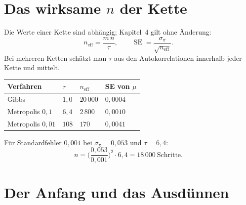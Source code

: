 \section{Das wirksame $n$ der Kette}

\begin{merksatz}
Die Werte einer Kette sind abhängig; Kapitel~4 gilt ohne Änderung:
\[ n_{\text{eff}} = \frac{m\,n}{\tau}, \qquad \operatorname{SE} = \frac{\sigma_\pi}{\sqrt{n_{\text{eff}}}} . \]
Bei mehreren Ketten schätzt man $\tau$ aus den Autokorrelationen innerhalb jeder Kette und mittelt.

\begin{center}
{\small
\renewcommand{\arraystretch}{1.48}
\begin{tabular}{@{}P{3.2cm}P{1.4cm}P{2.0cm}P{2.0cm}@{}}
\toprule
\textbf{Verfahren} & $\tau$ & $n_{\text{eff}}$ & \textbf{SE von $\mu$}\\
\midrule
Gibbs & $1{,}0$ & $20\,000$ & $0{,}0004$\\
Metropolis $0{,}1$ & $6{,}4$ & $2\,800$ & $0{,}0010$\\
Metropolis $0{,}01$ & $108$ & $170$ & $0{,}0041$\\
\bottomrule
\end{tabular}}
\end{center}

Für Standardfehler $0{,}001$ bei $\sigma_\pi = 0{,}053$ und $\tau = 6{,}4$:
\[ n = \Big(\frac{0{,}053}{0{,}001}\Big)^2\cdot 6{,}4 = 18\,000 \ \text{Schritte} . \]

\begin{center}
\begin{minipage}{0.88\textwidth}
\end{minipage}
\end{center}
\end{merksatz}

\section{Der Anfang und das Ausdünnen}

